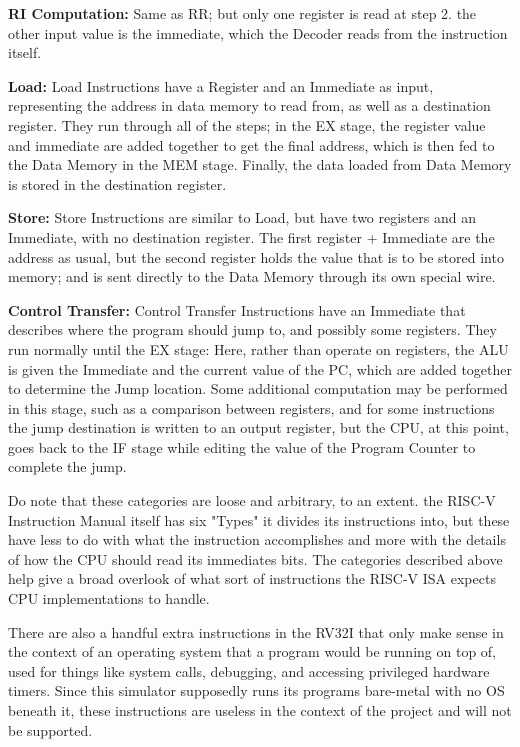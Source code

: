 \documentclass[12pt,twoside]{reedthesis}
\begin{document}
\textbf{RI Computation:} Same as RR; but only one register is read at step 2. the other input value is the immediate, which the Decoder reads from the instruction itself.

\textbf{Load:} Load Instructions have a Register and an Immediate as input, representing the address in data memory to read from, as well as a destination register. They run through all of the steps; in the EX stage, the register value and immediate are added together to get the final address, which is then fed to the Data Memory in the MEM stage. Finally, the data loaded from Data Memory is stored in the destination register.

\textbf{Store:} Store Instructions are similar to Load, but have two registers and an Immediate, with no destination register. The first register + Immediate are the address as usual, but the second register holds the value that is to be stored into memory; and is sent directly to the Data Memory through its own special wire.

\textbf{Control Transfer:} Control Transfer Instructions have an Immediate that describes where the program should jump to, and possibly some registers. They run normally until the EX stage: Here, rather than operate on registers, the ALU is given the Immediate and the current value of the PC, which are added together to determine the Jump location. Some additional computation may be performed in this stage, such as a comparison between registers, and for some instructions the jump destination is written to an output register, but the CPU, at this point, goes back to the IF stage while editing the value of the Program Counter to complete the jump.

Do note that these categories are loose and arbitrary, to an extent. the RISC-V Instruction Manual itself has six "Types" it divides its instructions into, but these have less to do with what the instruction accomplishes and more with the details of how the CPU should read its immediates bits. The categories described above help give a broad overlook of what sort of instructions the RISC-V ISA expects CPU implementations to handle.

There are also a handful extra instructions in the RV32I that only make sense in the context of an operating system that a program would be running on top of, used for things like system calls, debugging, and accessing privileged hardware timers. Since this simulator supposedly runs its programs bare-metal with no OS beneath it, these instructions are useless in the context of the project and will not be supported.
\end{document}
